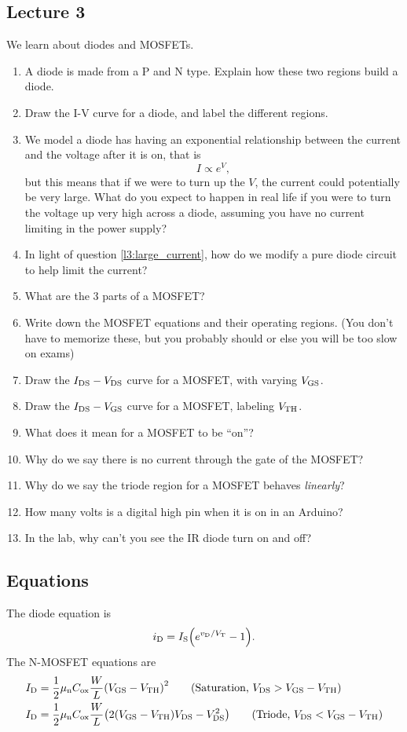 \subsection*{Lecture 3}
We learn about diodes and MOSFETs.

\begin{enumerate}
  \item A diode is made from a P and N type. Explain how these two regions build a diode.
  \item Draw the I-V curve for a diode, and label the different regions.
  \item We model a diode has having an exponential relationship between the current and the voltage
  after it is on, that is 
  \begin{equation*}
    I \propto e^V,
  \end{equation*}
  but this means that if we were to turn up the $V$, the current could
  potentially be very large. What do you expect to happen in real life if you
  were to turn the voltage up very high across a diode, assuming you have no
  current limiting in the power supply?

  \label{l3:large_current}

  \item In light of question
  \ref{l3:large_current},
  how do we modify a pure diode circuit to help limit the current?

  \item What are the 3 parts of a MOSFET?
  \item Write down the MOSFET equations and their operating regions. (You
  don't have to memorize these, but you probably should or else you will be
  too slow on exams)
  \item Draw the $I_\text{DS}-V_\text{DS}$ curve for a MOSFET, with varying $V_\text{GS}$.
  \item Draw the $I_\text{DS}-V_\text{GS}$ curve for a MOSFET, labeling $V_\text{TH}$.
  \item What does it mean for a MOSFET to be ``on''?
  \item Why do we say there is no current through the gate of the MOSFET?
  \item Why do we say the triode region for a MOSFET behaves \textit{linearly}?

  \item How many volts is a digital high pin when it is on in an Arduino?
  \item In the lab, why can't you see the IR diode turn on and off? 
\end{enumerate}

\subsection*{Equations}
The diode equation is
\begin{equation}
  \iD = \IS \pa{e^{\vD/\VT} - 1}.
\end{equation}
The N-MOSFET equations are 
\begin{align*}
  \ID &= \frac{1}{2}\Kn \pa{\VGS - \VTH}^2 \tag{Saturation, $\VDS > \VGS - \VTH$}\\
  \ID &= \frac{1}{2}\Kn \pa{2\pa{\VGS - \VTH}\VDS - \VDS^2} \tag{Triode, $\VDS < \VGS - \VTH$}
\end{align*}
